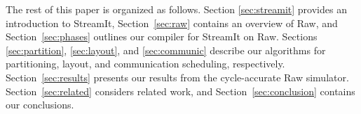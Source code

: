 The rest of this paper is organized as follows.  Section
\ref{sec:streamit} provides an introduction to StreamIt,
Section~\ref{sec:raw} contains an overview of Raw, and
Section~\ref{sec:phases} outlines our compiler for StreamIt on Raw.
Sections \ref{sec:partition}, \ref{sec:layout}, and \ref{sec:communic}
describe our algorithms for partitioning, layout, and communication
scheduling, respectively.  Section~\ref{sec:results} presents our
results from the cycle-accurate Raw simulator.
Section~\ref{sec:related} considers related work, and
Section~\ref{sec:conclusion} contains our conclusions.
